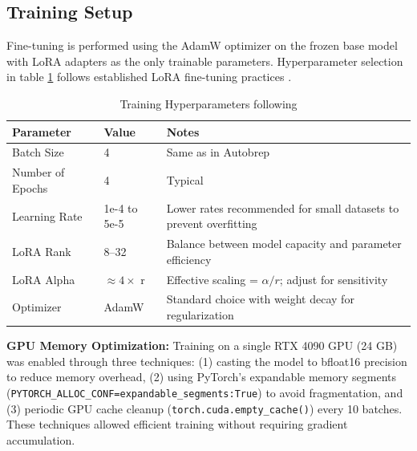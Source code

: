 \newpage

\subsection{Training Setup}

Fine-tuning is performed using the AdamW optimizer on the frozen base model with LoRA adapters as the only trainable parameters. Hyperparameter selection in table \ref{tab:training_hyperparams} follows established LoRA fine-tuning practices \cite{Hu2021lora, UnSloth2024lora}.
\par

\begin{table}[h!]
	\centering
	\caption{Training Hyperparameters following \cite{Hu2021lora}}
	\label{tab:training_hyperparams}
	\small
	\begin{tabularx}{\textwidth}{@{}l X l@{}}
		\toprule
		\textbf{Parameter} & \textbf{Value} & \textbf{Notes} \\
		\midrule
		Batch Size & 4 & Same as in Autobrep \cite{Xu2025autobrep} \\
		Number of Epochs & 4 & Typical  \\
		Learning Rate & 1e-4 to 5e-5 & Lower rates recommended for small datasets to prevent overfitting \\
		LoRA Rank & 8--32 & Balance between model capacity and parameter efficiency \\
		LoRA Alpha & $\approx 4 \times$ r & Effective scaling = $\alpha / r$; adjust for sensitivity \\
		Optimizer & AdamW & Standard choice with weight decay for regularization \\
		\bottomrule
	\end{tabularx}
\end{table}

\par

\textbf{GPU Memory Optimization:} Training on a single RTX 4090 GPU (24 GB) was enabled through three techniques: (1) casting the model to bfloat16 precision to reduce memory overhead, (2) using PyTorch's expandable memory segments
\newline (\texttt{PYTORCH\_ALLOC\_CONF=expandable\_segments:True}) to avoid fragmentation, and (3) periodic GPU cache cleanup (\texttt{torch.cuda.empty\_cache()}) every 10 batches. These techniques allowed efficient training without requiring gradient accumulation.

